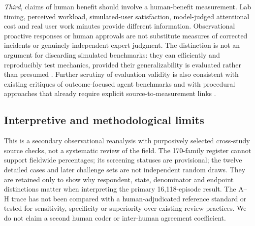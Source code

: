 \emph{Third}, claims of human benefit should involve a human-benefit measurement. Lab timing, perceived workload, simulated-user satisfaction, model-judged attentional cost and real user work minutes provide different information. Observational proactive responses or human approvals are not substitute measures of corrected incidents or genuinely independent expert judgment. The distinction is not an argument for discarding simulated benchmarks: they can efficiently and reproducibly test mechanics, provided their generalizability is evaluated rather than presumed \cite{ref44,ref46}. Further scrutiny of evaluation validity is also consistent with existing critiques of outcome-focused agent benchmarks and with procedural approaches that already require explicit source-to-measurement links \cite{ref8,ref9}.

\subsection{Interpretive and methodological limits}
This is a secondary observational reanalysis with purposively selected cross-study source checks, not a systematic review of the field. The 170-family register cannot support fieldwide percentages; its screening statuses are provisional; the twelve detailed cases and later challenge sets are not independent random draws. They are retained only to show why respondent, state, denominator and endpoint distinctions matter when interpreting the primary 16,118-episode result. The A--H trace has not been compared with a human-adjudicated reference standard or tested for sensitivity, specificity or superiority over existing review practices. We do not claim a second human coder or inter-human agreement coefficient.

